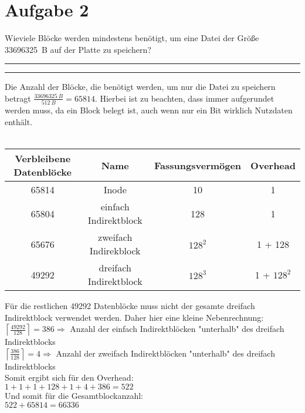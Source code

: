 \documentclass{ti2}
\makeatletter
\renewenvironment{quote}{%
  \vskip 10\p@
  \parindent\z@
  \tcolorbox[
    breakable, sharp corners,
    boxrule=\z@, boxsep=\z@,
    left=\z@, right=\z@,
    top=\z@, bottom=\z@,
    colback=sx-yellow
  ]
  {\color{sx-orange}\d@ublerule}
  \vskip 5\p@
  \list{}{\rightmargin\leftmargin}%
  \item\relax
}{%
  \endlist
  {\color{sx-orange}\d@ublerule}
  \endtcolorbox
  \vskip 5\p@
}
\def\d@ublerule{\hrule\@width\hsize\kern 1.5\p@\hrule\@width\hsize}
\makeatother
\begin{document}
\section*{Aufgabe 2}
\begin{quote}
	Wieviele Blöcke werden mindestens benötigt, um eine Datei der Größe 33696325~B auf der Platte
	zu speichern?
\end{quote}
Die Anzahl der Blöcke, die benötigt werden, um nur die Datei zu speichern betragt $\frac{33696325~B}{512~B}=65814$. Hierbei ist zu beachten, dass immer aufgerundet werden muss, da ein Block belegt ist, auch wenn nur ein Bit wirklich Nutzdaten enthält.\\\\
\begin{tabular}{c|c|c|c}
Verbleibene Datenblöcke & Name 						& Fassungsvermögen 	& Overhead 		\\ \hline
65814					& Inode						& 10				& 1				\\ \hline
65804					& einfach Indirektblock		& 128				& 1				\\ \hline
65676					& zweifach Indirekblock 	& $128^2$			& 1 + 128		\\ \hline\hline
49292					& dreifach Indirektblock 	& $128^3$			& 1 + $128^2$
\end{tabular}
Für die restlichen 49292 Datenblöcke muss nicht der gesamte dreifach Indirektblock verwendet werden. Daher hier eine kleine Nebenrechnung:\\
$\left\lceil\frac{49292}{128}\right\rceil=386 \Rightarrow$ Anzahl der einfach Indirektblöcken "{}unterhalb" des dreifach Indirektblocks\\
$\left\lceil\frac{386}{128}\right\rceil=4 \Rightarrow$ Anzahl der zweifach Indirektblöcken "{}unterhalb" des dreifach Indirektblocks\\
Somit ergibt sich für den Overhead:\\
$1+1+1+128+1+4+386=522$\\
Und somit für die Gesamtblockanzahl:\\
\underline{\underline{$522+65814=66336$}}
\end{document}
